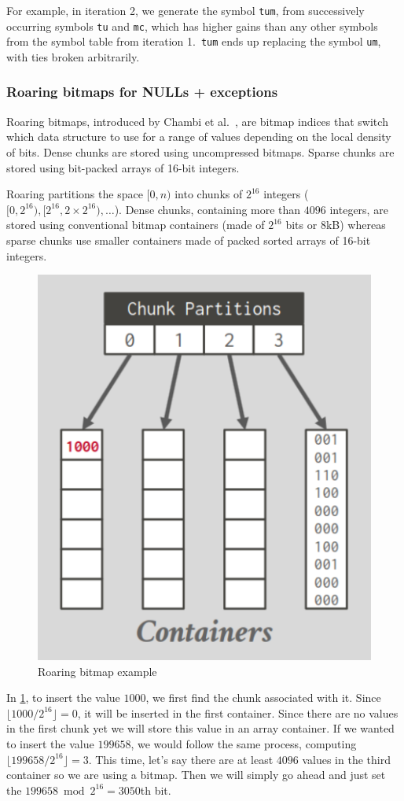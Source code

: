 \documentclass[11pt]{article}
\begin{document}
For example, in iteration 2, we generate the symbol \texttt{tum}, from successively occurring symbols \texttt{tu} and \texttt{mc}, which has higher gains than any other symbols from the symbol table from iteration 1.\ \texttt{tum} ends up replacing the symbol \texttt{um}, with ties broken arbitrarily.

\subsubsection{Roaring bitmaps for NULLs + exceptions}\label{sec:roaring}
Roaring bitmaps, introduced by Chambi et al.~\cite{Chambi_2015}, are bitmap indices that switch which data structure to use for a range of values depending on the local density of bits. Dense chunks are stored using uncompressed bitmaps. Sparse chunks are stored using bit-packed arrays of 16-bit integers.

Roaring partitions the space $[0,n)$ into chunks of $2^{16}$ integers ($[0,2^{16}),[2^{16},2\times 2^{16}),\ldots$). Dense chunks, containing more than $4096$ integers, are stored using conventional bitmap containers (made of $2^{16}$ bits or $8$kB) whereas sparse chunks use smaller containers made of packed sorted arrays of 16-bit integers.

\begin{figure}[H]
    \centering
    \includegraphics[width=0.3\linewidth]{fig/roaring.pdf}
    \caption{Roaring bitmap example}\label{fig:roaring-example}
\end{figure}

In \cref{fig:roaring-example}, to insert the value $1000$, we first find the chunk associated with it. Since $\lfloor1000/2^{16}\rfloor=0$, it will be inserted in the first container. Since there are no values in the first chunk yet we will store this value in an array container. If we wanted to insert the value $199658$, we would follow the same process, computing $\lfloor{199658/2^{16}}\rfloor = 3$. This time, let's say there are at least $4096$ values in the third container so we are using a bitmap. Then we will simply go ahead and just set the $199658\bmod 2^{16}=3050$th bit.
\end{document}
